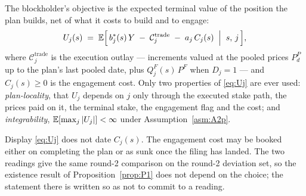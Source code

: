 \begin{definition}
\label{def:U}
The blockholder's objective is the expected terminal value of the position the plan builds, net of
what it costs to build and to engage:
\begin{equation}
\label{eq:Uj}
U_j(s) \;=\; \mathbb{E}\Bigl[\, b_j^*(s)\,Y \;-\; \mathcal C_j^{\mathrm{trade}} \;-\; a_j\,C_j(s)
\;\Bigm\vert\; s,\, j \,\Bigr],
\end{equation}
where $\mathcal C_j^{\mathrm{trade}}$ is the execution outlay --- increments valued at the pooled
prices $P_d^P$ up to the plan's last pooled date, plus $Q_j^F(s)\,P^F$ when $D_j = 1$ --- and
$C_j(s) \ge 0$ is the engagement cost. Only two properties of \eqref{eq:Uj} are ever used:
\emph{plan-locality}, that $U_j$ depends on $j$ only through the executed stake path, the prices paid
on it, the terminal stake, the engagement flag and the cost; and \emph{integrability},
$\mathbb{E}[\max_{j}|U_j|] < \infty$ under Assumption~\ref{asm:A2p}.
\end{definition}

\begin{remark}
\label{rem:Ctiming}
Display \eqref{eq:Uj} does not date $C_j(s)$. The engagement cost may be booked either on completing
the plan or as sunk once the filing has landed. The two readings give the same round-2 comparison on
the round-2 deviation set, so the existence result of Proposition~\ref{prop:P1} does not depend on
the choice; the statement there is written so as not to commit to a reading.
\end{remark}

